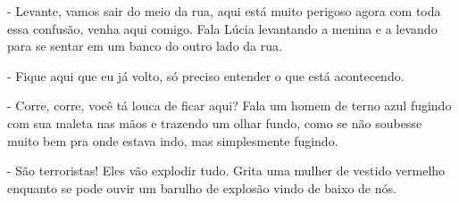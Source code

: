 - Levante, vamos sair do meio da rua, aqui está muito perigoso agora com toda essa confusão, venha aqui comigo. Fala Lúcia levantando a menina e a levando para se sentar em um banco do outro lado da rua.

- Fique aqui que eu já volto, só preciso entender o que está acontecendo.

- Corre, corre, você tá louca de ficar aqui? Fala um homem de terno azul fugindo com sua maleta nas mãos e trazendo um olhar fundo, como se não soubesse muito bem pra onde estava indo, mas simplesmente fugindo.

- São terroristas! Eles vão explodir tudo. Grita uma mulher de vestido vermelho enquanto se pode ouvir um barulho de explosão vindo de baixo de nós.